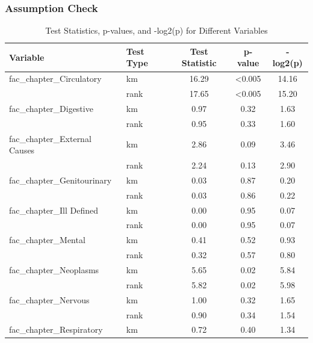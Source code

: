 \clearpage
\subsubsection*{Assumption Check}
\begin{table}[H]
    \centering
    \caption{Test Statistics, p-values, and -log2(p) for Different Variables}
    \tiny
    \begin{tabular}{|l|l|c|c|c|}
    \hline
    \textbf{Variable}                & \textbf{Test Type} & \textbf{Test Statistic} & \textbf{p-value} & \textbf{-log2(p)} \\ \hline
    fac\_chapter\_Circulatory        & km   & 16.29 & <0.005 & 14.16 \\ \hline
                                    & rank & 17.65 & <0.005 & 15.20 \\ \hline
    fac\_chapter\_Digestive          & km   & 0.97  & 0.32   & 1.63  \\ \hline
                                    & rank & 0.95  & 0.33   & 1.60  \\ \hline
    fac\_chapter\_External Causes    & km   & 2.86  & 0.09   & 3.46  \\ \hline
                                    & rank & 2.24  & 0.13   & 2.90  \\ \hline
    fac\_chapter\_Genitourinary      & km   & 0.03  & 0.87   & 0.20  \\ \hline
                                    & rank & 0.03  & 0.86   & 0.22  \\ \hline
    fac\_chapter\_Ill Defined        & km   & 0.00  & 0.95   & 0.07  \\ \hline
                                    & rank & 0.00  & 0.95   & 0.07  \\ \hline
    fac\_chapter\_Mental             & km   & 0.41  & 0.52   & 0.93  \\ \hline
                                    & rank & 0.32  & 0.57   & 0.80  \\ \hline
    fac\_chapter\_Neoplasms          & km   & 5.65  & 0.02   & 5.84  \\ \hline
                                    & rank & 5.82  & 0.02   & 5.98  \\ \hline
    fac\_chapter\_Nervous            & km   & 1.00  & 0.32   & 1.65  \\ \hline
                                    & rank & 0.90  & 0.34   & 1.54  \\ \hline
    fac\_chapter\_Respiratory        & km   & 0.72  & 0.40   & 1.34  \\ \hline

\end{tabular}
\end{table}
